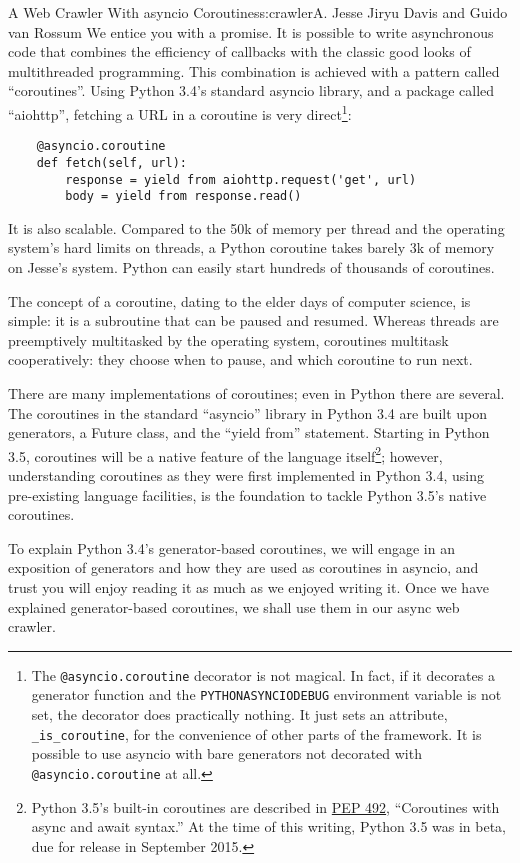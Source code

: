 \begin{aosachapter}{A Web Crawler With asyncio Coroutines}{s:crawler}{A. Jesse Jiryu Davis and Guido van Rossum}
We entice you with a promise. It is possible to write asynchronous code
that combines the efficiency of callbacks with the classic good looks of
multithreaded programming. This combination is achieved with a pattern
called ``coroutines''. Using Python 3.4's standard asyncio library, and
a package called ``aiohttp'', fetching a URL in a coroutine is very
direct\footnote{The \texttt{@asyncio.coroutine} decorator is not
  magical. In fact, if it decorates a generator function and the
  \texttt{PYTHONASYNCIODEBUG} environment variable is not set, the
  decorator does practically nothing. It just sets an attribute,
  \texttt{\_is\_coroutine}, for the convenience of other parts of the
  framework. It is possible to use asyncio with bare generators not
  decorated with \texttt{@asyncio.coroutine} at all.}:

\begin{verbatim}
    @asyncio.coroutine
    def fetch(self, url):
        response = yield from aiohttp.request('get', url)
        body = yield from response.read()
\end{verbatim}

It is also scalable. Compared to the 50k of memory per thread and the
operating system's hard limits on threads, a Python coroutine takes
barely 3k of memory on Jesse's system. Python can easily start hundreds
of thousands of coroutines.

The concept of a coroutine, dating to the elder days of computer
science, is simple: it is a subroutine that can be paused and resumed.
Whereas threads are preemptively multitasked by the operating system,
coroutines multitask cooperatively: they choose when to pause, and which
coroutine to run next.

There are many implementations of coroutines; even in Python there are
several. The coroutines in the standard ``asyncio'' library in Python
3.4 are built upon generators, a Future class, and the ``yield from''
statement. Starting in Python 3.5, coroutines will be a native feature
of the language itself\footnote{Python 3.5's built-in coroutines are
  described in \href{https://www.python.org/dev/peps/pep-0492/}{PEP
  492}, ``Coroutines with async and await syntax.'' At the time of this
  writing, Python 3.5 was in beta, due for release in September 2015.};
however, understanding coroutines as they were first implemented in
Python 3.4, using pre-existing language facilities, is the foundation to
tackle Python 3.5's native coroutines.

To explain Python 3.4's generator-based coroutines, we will engage in an
exposition of generators and how they are used as coroutines in asyncio,
and trust you will enjoy reading it as much as we enjoyed writing it.
Once we have explained generator-based coroutines, we shall use them in
our async web crawler.


\end{aosachapter}
